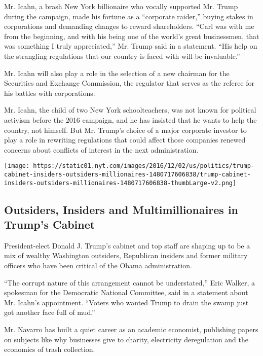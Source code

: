 Mr. Icahn, a brash New York billionaire who vocally supported Mr. Trump
during the campaign, made his fortune as a ``corporate raider,'' buying
stakes in corporations and demanding changes to reward shareholders.
``Carl was with me from the beginning, and with his being one of the
world's great businessmen, that was something I truly appreciated,'' Mr.
Trump said in a statement. ``His help on the strangling regulations that
our country is faced with will be invaluable.''

Mr. Icahn will also play a role in the selection of a new chairman for
the Securities and Exchange Commission, the regulator that serves as the
referee for his battles with corporations.

Mr. Icahn, the child of two New York schoolteachers, was not known for
political activism before the 2016 campaign, and he has insisted that he
wants to help the country, not himself. But Mr. Trump's choice of a
major corporate investor to play a role in rewriting regulations that
could affect those companies renewed concerns about conflicts of
interest in the next administration.

\href{https://www.nytimes.com/interactive/2016/12/05/us/politics/trump-cabinet-insiders-outsiders-millionaires.html}{}

\texttt{[image: https://static01.nyt.com/images/2016/12/02/us/politics/trump-cabinet-insiders-outsiders-millionaires-1480717606838/trump-cabinet-insiders-outsiders-millionaires-1480717606838-thumbLarge-v2.png]}

\hypertarget{outsiders-insiders-and-multimillionaires-in-trumps-cabinet}{%
\subsection{Outsiders, Insiders and Multimillionaires in Trump's
Cabinet}\label{outsiders-insiders-and-multimillionaires-in-trumps-cabinet}}

President-elect Donald J. Trump's cabinet and top staff are shaping up
to be a mix of wealthy Washington outsiders, Republican insiders and
former military officers who have been critical of the Obama
administration.

``The corrupt nature of this arrangement cannot be understated,'' Eric
Walker, a spokesman for the Democratic National Committee, said in a
statement about Mr. Icahn's appointment. ``Voters who wanted Trump to
drain the swamp just got another face full of mud.''

Mr. Navarro has built a quiet career as an academic economist,
publishing papers on subjects like why businesses give to charity,
electricity deregulation and the economics of trash collection.

